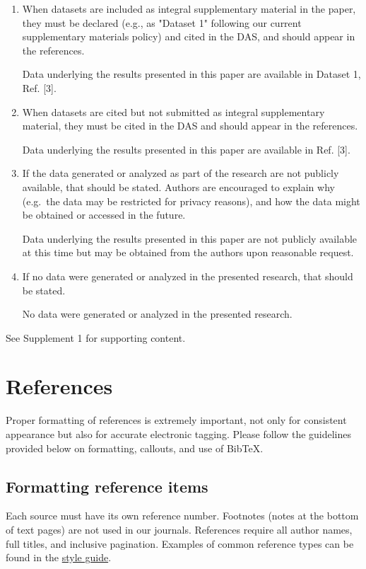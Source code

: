 \documentclass{../packages/optica-article}
\begin{document}
\begin{backmatter}
	\begin{enumerate}
		\item When datasets are included as integral supplementary material in the paper, they must be declared (e.g., as "Dataset 1" following our current supplementary materials policy) and cited in the DAS, and should appear in the references.

		       Data underlying the results presented in this paper are available in Dataset 1, Ref. [3].


		\item When datasets are cited but not submitted as integral supplementary material, they must be cited in the DAS and should appear in the references.

		       Data underlying the results presented in this paper are available in Ref. [3].


		\item If the data generated or analyzed as part of the research are not publicly available, that should be stated. Authors are encouraged to explain why (e.g.~the data may be restricted for privacy reasons), and how the data might be obtained or accessed in the future.

		       Data underlying the results presented in this paper are not publicly available at this time but may be obtained from the authors upon reasonable request.


		\item If no data were generated or analyzed in the presented research, that should be stated.

		       No data were generated or analyzed in the presented research.
	\end{enumerate}


	See Supplement 1 for supporting content.

\end{backmatter}

\section{References}
\label{sec:refs}
Proper formatting of references is extremely important, not only for consistent appearance but also for accurate electronic tagging. Please follow the guidelines provided below on formatting, callouts, and use of Bib\TeX.

\subsection{Formatting reference items}
Each source must have its own reference number. Footnotes (notes at the bottom of text pages) are not used in our journals. References require all author names, full titles, and inclusive pagination. Examples of common reference types can be found in the  \href{https://opg.optica.org/jot/submit/style/oestyleguide.cfm} {style guide}.
\end{document}
